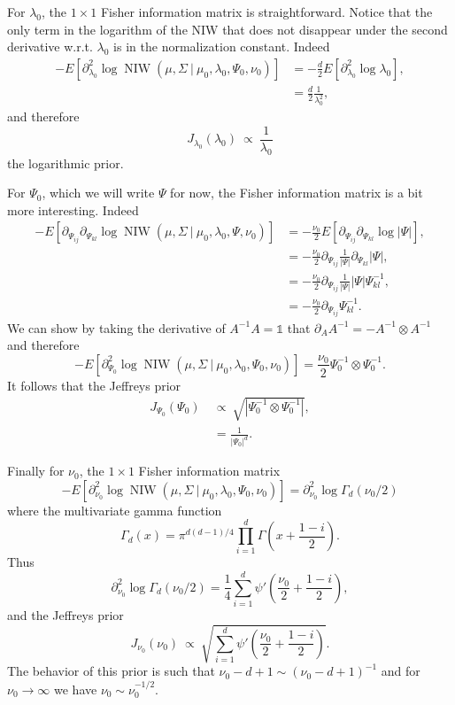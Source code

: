 \documentclass[11pt, oneside]{article}   	%
\DeclareMathOperator{\NIW}{NIW}
\begin{document}
For $\lambda_0$, the $1\times 1$ Fisher information matrix is straightforward. Notice that the only term in the logarithm of the NIW that does not disappear under the second derivative w.r.t. $\lambda_0$ is in the normalization constant. Indeed
\begin{equation}\begin{split}
-E\left[\partial^2_{\lambda_0}\log \NIW(\mu,\Sigma~\vert~\mu_0,\lambda_0,\Psi_0,\nu_0)\right] &= -\frac{d}{2}E[\partial^2_{\lambda_0}\log \lambda_0],\\
&= \frac{d}{2}\frac{1}{\lambda_0^2},
\end{split}\end{equation}
and therefore
$$J_{\lambda_0}(\lambda_0)~\propto~\frac{1}{\lambda_0}$$
the logarithmic prior.

For $\Psi_0$, which we will write $\Psi$ for now, the Fisher information matrix is a bit more interesting. Indeed
\begin{equation}\begin{split}
-E\left[\partial_{\Psi_{ij}}\partial_{\Psi_{kl}}\log \NIW(\mu,\Sigma~\vert~\mu_0,\lambda_0,\Psi,\nu_0)\right] &= -\frac{\nu_0}{2}E[\partial_{\Psi_{ij}}\partial_{\Psi_{kl}}\log\vert\Psi\vert], \\
&=-\frac{\nu_0}{2}\partial_{\Psi_{ij}}\frac{1}{\vert\Psi\vert}\partial_{\Psi_{kl}}\vert\Psi\vert,\\
&= -\frac{\nu_0}{2}\partial_{\Psi_{ij}}\frac{1}{\vert\Psi\vert}\vert\Psi\vert \Psi^{-1}_{kl},\\
&=-\frac{\nu_0}{2} \partial_{\Psi_{ij}}\Psi_{kl}^{-1}.
\end{split}\end{equation}
We can show by taking the derivative of $A^{-1} A = \mathbb{1}$ that $\partial_A A^{-1} = -A^{-1}\otimes A^{-1}$ and therefore
$$-E\left[\partial^2_{\Psi_{0}}\log \NIW(\mu,\Sigma~\vert~\mu_0,\lambda_0,\Psi_0,\nu_0)\right] = \frac{\nu_0}{2}\Psi_0^{-1}\otimes\Psi_0^{-1}.$$
It follows that the Jeffreys prior
\begin{equation}\begin{split}
J_{\Psi_0}(\Psi_0)~&\propto~ \sqrt{\left\vert\Psi_0^{-1}\otimes\Psi_0^{-1}\right\vert},\\
&= \frac{1}{\left\vert\Psi_0\right\vert^d}.
\end{split}\label{eq:jeffpsi}\end{equation}

Finally for $\nu_0$, the $1\times 1$ Fisher information matrix
$$-E\left[\partial^2_{\nu_0}\log \NIW(\mu,\Sigma~\vert~\mu_0,\lambda_0,\Psi_0,\nu_0)\right] = \partial^2_{\nu_0}\log\Gamma_d(\nu_0/2)$$
where the multivariate gamma function
$$\Gamma_d(x) = \pi^{d(d-1)/4}\prod_{i=1}^d\Gamma\left(x + \frac{1 - i}{2}\right).$$
Thus
$$\partial^2_{\nu_0}\log\Gamma_d(\nu_0/2) = \frac{1}{4}\sum_{i=1}^d \psi'\left(\frac{\nu_0}{2} + \frac{1 - i}{2}\right),$$
and the Jeffreys prior
$$J_{\nu_0}(\nu_0)~\propto~\sqrt{\sum_{i=1}^d \psi'\left(\frac{\nu_0}{2} + \frac{1 - i}{2}\right)}.$$
The behavior of this prior is such that $\nu_0 - d + 1\sim (\nu_0 - d + 1)^{-1}$ and for $\nu_0\rightarrow\infty$ we have $\nu_0\sim \nu_0^{-1/2}$. 
\end{document}
